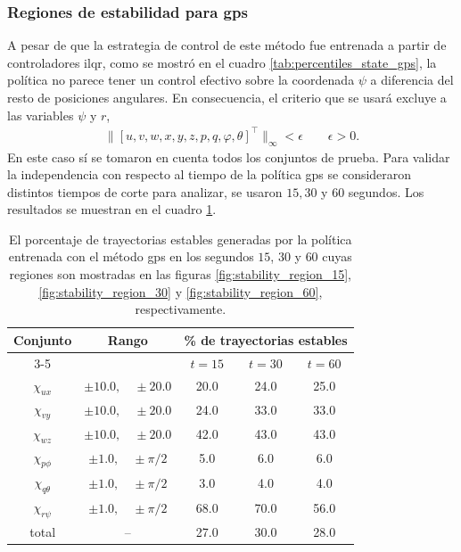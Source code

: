 \subsubsection{Regiones de estabilidad para \acrshort{gps}}
A pesar de que la estrategia de control de este método fue entrenada a partir de controladores \acrshort{ilqr}, como se mostró en el cuadro \ref{tab:percentiles_state_gps}, la política no parece tener un control efectivo sobre la coordenada $\psi$ a diferencia del resto de posiciones angulares. En consecuencia, el criterio que se usará excluye a las variables $\psi$ y $r$,
    \begin{align}
    \label{eq:gps_criteria}
        \|[u, v, w, x, y, z, p, q, \varphi, \theta]^{\top}\|_{\infty} < \epsilon \qquad \epsilon > 0.
    \end{align}
En este caso sí se tomaron en cuenta todos los conjuntos de prueba. Para validar la independencia con respecto al tiempo de la política \acrshort{gps} se consideraron distintos tiempos de corte para analizar, se usaron $15, 30$ y $60$ segundos. Los resultados se muestran en el cuadro \ref{tab:stability_region_gps}.

\begin{table}[H]
\centering
\caption{El porcentaje de trayectorias estables generadas por la política entrenada con el método \acrshort{gps} en los segundos $15$, $30$ y $60$ cuyas regiones son mostradas en las figuras \ref{fig:stability_region_15}, \ref{fig:stability_region_30} y \ref{fig:stability_region_60}, respectivamente.}
\label{tab:stability_region_gps}
\begin{tabular}{|c|c|c|c|c|}
\hline
\multirow{2}{*}{Conjunto} & \multirow{2}{*}{Rango} & \multicolumn{3}{c|}{\% de trayectorias estables} \\ \cline{3-5}
                          &                          & $t=15$ & $t=30$ & $t=60$                       \\ \hline
$\chi_{ux}$ & $\pm\text{10.0},\quad\pm\text{20.0}$ & 20.0 & 24.0  & 25.0       \\
$\chi_{vy}$ & $\pm\text{10.0},\quad\pm\text{20.0}$ & 24.0 & 33.0  & 33.0       \\
$\chi_{wz}$ & $\pm\text{10.0},\quad\pm\text{20.0}$ & 42.0 & 43.0  & 43.0      \\
$\chi_{p\phi}$ & $\pm\text{1.0},\quad\pm\pi/2$ & 5.0 & 6.0  & 6.0\\
$\chi_{q\theta}$ & $\pm\text{1.0},\quad\pm\pi/2$ & 3.0 & 4.0  & 4.0\\
$\chi_{r\psi}$ & $\pm\text{1.0},\quad\pm\pi/2$ & 68.0 & 70.0  & 56.0\\
total         & --            & 27.0 & 30.0  & 28.0 \\
\hline
\end{tabular}
\end{table}

